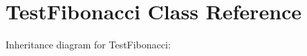 \hypertarget{classTestFibonacci}{}\section{Test\+Fibonacci Class Reference}
\label{classTestFibonacci}


Inheritance diagram for Test\+Fibonacci\+:
